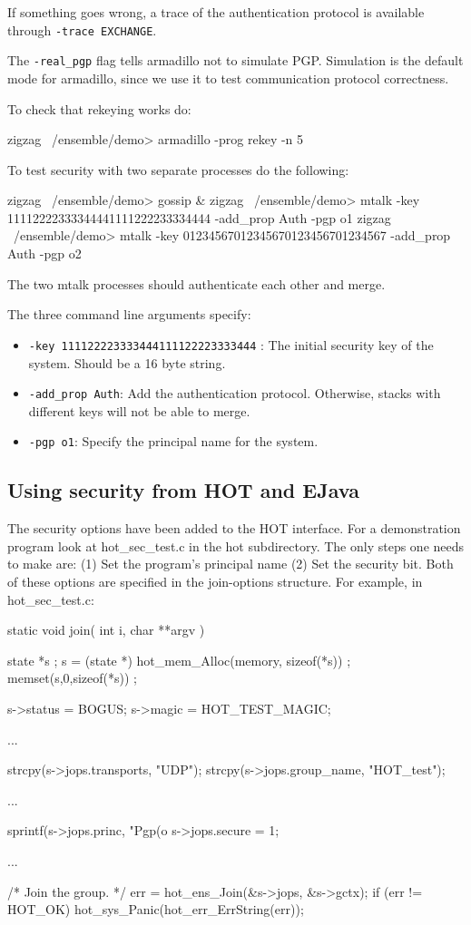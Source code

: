 If something goes wrong, a trace of the authentication protocol is
available through {\tt -trace EXCHANGE}. 

The {\tt -real\_pgp} flag tells armadillo not to simulate PGP. 
Simulation is the default mode for armadillo, since we use it to
test communication protocol correctness. 

To check that rekeying works do: 
\begin{codebox}
zigzag ~/ensemble/demo> armadillo -prog rekey  -n 5
\end{codebox}


To test security with two separate processes do the following:
\begin{codebox}
zigzag ~/ensemble/demo> gossip &
zigzag ~/ensemble/demo> mtalk -key 11112222333344441111222233334444 
                  -add_prop Auth -pgp o1
zigzag ~/ensemble/demo> mtalk -key 01234567012345670123456701234567 
                 -add_prop Auth -pgp o2
\end{codebox}

The two mtalk processes should authenticate each other and merge.

The three command line arguments specify:
\begin{itemize}
\item {\tt -key 111122223333444111122223333444} : The initial security key of the
      system. Should be a 16 byte string.
\item {\tt -add\_prop Auth}: Add the authentication protocol.
      Otherwise, stacks with different keys will not be able to
      merge. 
\item {\tt -pgp o1}: Specify the principal name for the system.
\end{itemize}

\subsection{Using security from HOT and EJava}
The security options have been added to the HOT interface. For a
demonstration program look at hot\_sec\_test.c in the hot subdirectory. 
The only steps one needs to make are: (1) Set the program's principal
name (2) Set the security bit. Both of these options are specified in the
join-options structure. For example, in hot\_sec\_test.c:
\begin{codebox}
static void join(
		 int i,
		 char **argv
) {
  state *s ;
  s = (state *) hot_mem_Alloc(memory, sizeof(*s)) ;
  memset(s,0,sizeof(*s)) ;
  
  s->status = BOGUS;
  s->magic = HOT_TEST_MAGIC;

  ...

  strcpy(s->jops.transports, "UDP");
  strcpy(s->jops.group_name, "HOT_test");
  
  ...

  sprintf(s->jops.princ, "Pgp(o%
  s->jops.secure = 1;

  ...
  
  /* Join the group.
   */
  err = hot_ens_Join(&s->jops, &s->gctx);
  if (err != HOT_OK) {
    hot_sys_Panic(hot_err_ErrString(err));
  }

}
\end{codebox}

